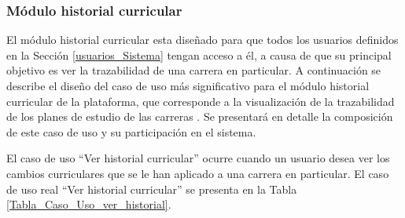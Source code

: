 	
	
	\subsubsection{Módulo historial curricular}
	
	El módulo historial curricular esta diseñado para que todos los usuarios definidos en la Sección \ref{usuarios_Sistema} tengan acceso a él, a causa de que su principal objetivo es ver la trazabilidad de una carrera en particular.
	A continuación se describe el diseño del caso de uso más significativo para el módulo  historial curricular de la plataforma, que corresponde a la visualización de la trazabilidad de los planes de estudio de las carreras . Se presentará en detalle la composición de este caso de uso y su participación en el sistema.
		
	
	El caso de uso “Ver historial curricular” ocurre cuando un usuario  desea  ver los cambios  curriculares que se le han aplicado a una carrera en particular. El caso de uso real “Ver historial curricular” se presenta en la Tabla \ref{Tabla_Caso_Uso_ver_historial}.
	
